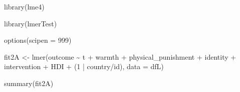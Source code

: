 \documentclass[
  letterpaper,
  DIV=11,
  numbers=noendperiod]{scrreprt}
\newenvironment{Shaded}{\begin{snugshade}}{\end{snugshade}}
\newcommand{\AttributeTok}[1]{\textcolor[rgb]{0.40,0.45,0.13}{#1}}
\newcommand{\DecValTok}[1]{\textcolor[rgb]{0.68,0.00,0.00}{#1}}
\newcommand{\FunctionTok}[1]{\textcolor[rgb]{0.28,0.35,0.67}{#1}}
\newcommand{\NormalTok}[1]{\textcolor[rgb]{0.00,0.23,0.31}{#1}}
\newcommand{\OtherTok}[1]{\textcolor[rgb]{0.00,0.23,0.31}{#1}}
\newcommand{\SpecialCharTok}[1]{\textcolor[rgb]{0.37,0.37,0.37}{#1}}
\begin{document}
\begin{Shaded}
\begin{Highlighting}[]
\FunctionTok{library}\NormalTok{(lme4) }

\FunctionTok{library}\NormalTok{(lmerTest)}

\FunctionTok{options}\NormalTok{(}\AttributeTok{scipen =} \DecValTok{999}\NormalTok{) }

\NormalTok{fit2A }\OtherTok{\textless{}{-}} \FunctionTok{lmer}\NormalTok{(outcome }\SpecialCharTok{\textasciitilde{}}\NormalTok{ t }\SpecialCharTok{+}\NormalTok{ warmth }\SpecialCharTok{+}\NormalTok{ physical\_punishment }\SpecialCharTok{+} 
\NormalTok{               identity }\SpecialCharTok{+}\NormalTok{ intervention }\SpecialCharTok{+}\NormalTok{ HDI }\SpecialCharTok{+}
\NormalTok{               (}\DecValTok{1} \SpecialCharTok{|}\NormalTok{ country}\SpecialCharTok{/}\NormalTok{id),}
             \AttributeTok{data =}\NormalTok{ dfL)}

\FunctionTok{summary}\NormalTok{(fit2A)}
\end{Highlighting}
\end{Shaded}
\end{document}
